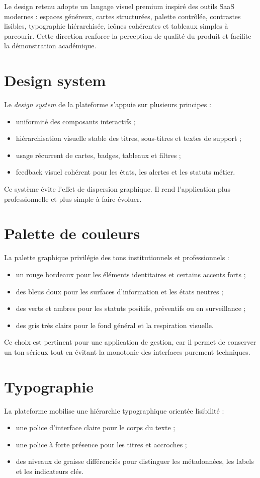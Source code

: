 ﻿\documentclass[12pt,a4paper,oneside]{report}
\begin{document}
Le design retenu adopte un langage visuel premium inspiré des outils SaaS modernes : espaces généreux, cartes structurées, palette contrôlée, contrastes lisibles, typographie hiérarchisée, icônes cohérentes et tableaux simples à parcourir. Cette direction renforce la perception de qualité du produit et facilite la démonstration académique.

\section{Design system}
Le \textit{design system} de la plateforme s'appuie sur plusieurs principes :
\begin{itemize}
  \item uniformité des composants interactifs ;
  \item hiérarchisation visuelle stable des titres, sous-titres et textes de support ;
  \item usage récurrent de cartes, badges, tableaux et filtres ;
  \item feedback visuel cohérent pour les états, les alertes et les statuts métier.
\end{itemize}

Ce système évite l'effet de dispersion graphique. Il rend l'application plus professionnelle et plus simple à faire évoluer.

\section{Palette de couleurs}
La palette graphique privilégie des tons institutionnels et professionnels :
\begin{itemize}
  \item un rouge bordeaux pour les éléments identitaires et certains accents forts ;
  \item des bleus doux pour les surfaces d'information et les états neutres ;
  \item des verts et ambres pour les statuts positifs, préventifs ou en surveillance ;
  \item des gris très clairs pour le fond général et la respiration visuelle.
\end{itemize}

Ce choix est pertinent pour une application de gestion, car il permet de conserver un ton sérieux tout en évitant la monotonie des interfaces purement techniques.

\section{Typographie}
La plateforme mobilise une hiérarchie typographique orientée lisibilité :
\begin{itemize}
  \item une police d'interface claire pour le corps du texte ;
  \item une police à forte présence pour les titres et accroches ;
  \item des niveaux de graisse différenciés pour distinguer les métadonnées, les labels et les indicateurs clés.
\end{itemize}
\end{document}
